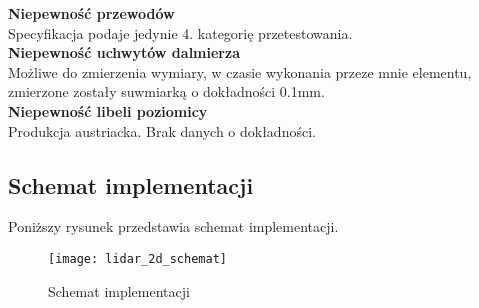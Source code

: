 \textbf{Niepewność przewodów}\\
Specyfikacja podaje jedynie 4. kategorię przetestowania.\\

\textbf{Niepewność uchwytów dalmierza}\\
Możliwe do zmierzenia wymiary, w czasie wykonania przeze mnie elementu, zmierzone zostały suwmiarką o dokładności 0.1mm.\\

\textbf{Niepewność libeli poziomicy}\\
Produkcja austriacka. Brak danych o dokładności.

\newpage
\subsection {Schemat implementacji}
Poniższy rysunek przedstawia schemat implementacji.

\begin{figure}[h]
    \centering
    \texttt{[image: lidar\_2d\_schemat]}
    \caption{Schemat implementacji}
    \label{fig:lidar_2d_schemat}
\end{figure} 
